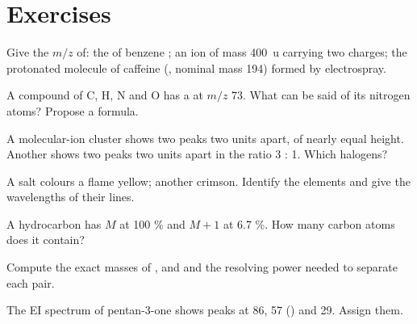 \section{Exercises}

\begin{exercise}[$\star$]\label{exo:b2:mass-spec-atomic:1}
Give the $m/z$ of: the  of benzene ; an ion of mass \qty{400}{u} carrying two
charges; the protonated molecule of caffeine (, nominal mass 194) formed by electrospray.
\end{exercise}

\begin{exercise}[$\star$]\label{exo:b2:mass-spec-atomic:2}
A compound of C, H, N and O has a  at $m/z$ 73. What can be said of its nitrogen atoms?
Propose a formula.
\end{exercise}

\begin{exercise}[$\star$]\label{exo:b2:mass-spec-atomic:3}
A molecular-ion cluster shows two peaks two units apart, of nearly equal height. Another shows two
peaks two units apart in the ratio 3 : 1. Which halogens?
\end{exercise}

\begin{exercise}[$\star$]\label{exo:b2:mass-spec-atomic:4}
A salt colours a flame yellow; another crimson. Identify the elements and give the wavelengths of their
lines.
\end{exercise}

\begin{exercise}[$\star\star$]\label{exo:b2:mass-spec-atomic:5}
A hydrocarbon has $M$ at 100 \% and $M+1$ at 6.7 \%. How many carbon atoms does it contain?
\end{exercise}

\begin{exercise}[$\star\star$]\label{exo:b2:mass-spec-atomic:6}
Compute the exact masses of ,  and  and the resolving power needed to separate
each pair.
\end{exercise}

\begin{exercise}[$\star\star$]\label{exo:b2:mass-spec-atomic:7}
The EI spectrum of pentan-3-one shows peaks at 86, 57 () and 29. Assign them.
\end{exercise}

